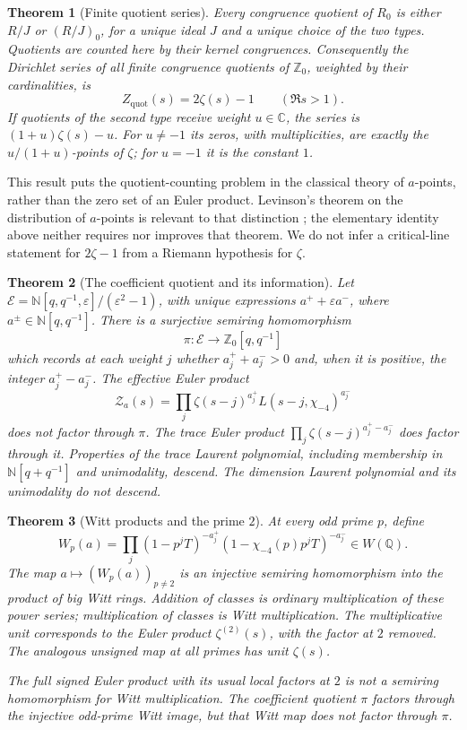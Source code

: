 \documentclass[11pt]{article}
\newcommand{\Z}{\mathbb Z}\newcommand{\N}{\mathbb N}\newcommand{\Q}{\mathbb Q}
\newcommand{\C}{\mathbb C}\newcommand{\B}{\mathbb B}
\newcommand{\eps}{\varepsilon}\newcommand{\supp}{\operatorname{supp}}
\newtheorem{theorem}{Theorem}[section]
\theoremstyle{definition}\newtheorem{definition}[theorem]{Definition}
\begin{document}
\begin{theorem}[Finite quotient series]\label{thm:quotient-main}
Every congruence quotient of $R_0$ is either $R/J$ or $(R/J)_0$, for a unique ideal $J$ and a unique choice of the two types. Quotients are counted here by their kernel congruences. Consequently the Dirichlet series of all finite congruence quotients of $\Z_0$, weighted by their cardinalities, is
\[
 Z_{\mathrm{quot}}(s)=2\zeta(s)-1\qquad(\Re s>1).
\]
If quotients of the second type receive weight $u\in\C$, the series is $(1+u)\zeta(s)-u$. For $u\ne-1$ its zeros, with multiplicities, are exactly the $u/(1+u)$-points of $\zeta$; for $u=-1$ it is the constant $1$.
\end{theorem}

This result puts the quotient-counting problem in the classical theory of $a$-points, rather than the zero set of an Euler product. Levinson's theorem on the distribution of $a$-points is relevant to that distinction \citep{Levinson}; the elementary identity above neither requires nor improves that theorem. We do not infer a critical-line statement for $2\zeta-1$ from a Riemann hypothesis for $\zeta$.

\begin{theorem}[The coefficient quotient and its information]\label{thm:sign-main}
Let $\mathcal E=\N[q,q^{-1},\eps]/(\eps^2-1)$, with unique expressions $a^++\eps a^-$, where $a^\pm\in\N[q,q^{-1}]$. There is a surjective semiring homomorphism
\[
 \pi:\mathcal E\longrightarrow\Z_0[q,q^{-1}]
\]
which records at each weight $j$ whether $a_j^++a_j^->0$ and, when it is positive, the integer $a_j^+-a_j^-$. The effective Euler product
\[
 \mathcal Z_a(s)=\prod_j\zeta(s-j)^{a_j^+}
                         L(s-j,\chi_{-4})^{a_j^-}
\]
does not factor through $\pi$. The trace Euler product $\prod_j\zeta(s-j)^{a_j^+-a_j^-}$ does factor through it. Properties of the trace Laurent polynomial, including membership in $\N[q+q^{-1}]$ and unimodality, descend. The dimension Laurent polynomial and its unimodality do not descend.
\end{theorem}

\begin{theorem}[Witt products and the prime $2$]\label{thm:witt-main}
At every odd prime $p$, define
\[
 W_p(a)=\prod_j(1-p^jT)^{-a_j^+}
                  (1-\chi_{-4}(p)p^jT)^{-a_j^-}\in W(\Q).
\]
The map $a\mapsto(W_p(a))_{p\ne2}$ is an injective semiring homomorphism into the product of big Witt rings. Addition of classes is ordinary multiplication of these power series; multiplication of classes is Witt multiplication. The multiplicative unit corresponds to the Euler product $\zeta^{(2)}(s)$, with the factor at $2$ removed. The analogous unsigned map at all primes has unit $\zeta(s)$.

The full signed Euler product with its usual local factors at $2$ is not a semiring homomorphism for Witt multiplication. The coefficient quotient $\pi$ factors through the injective odd-prime Witt image, but that Witt map does not factor through $\pi$.
\end{theorem}
\end{document}
